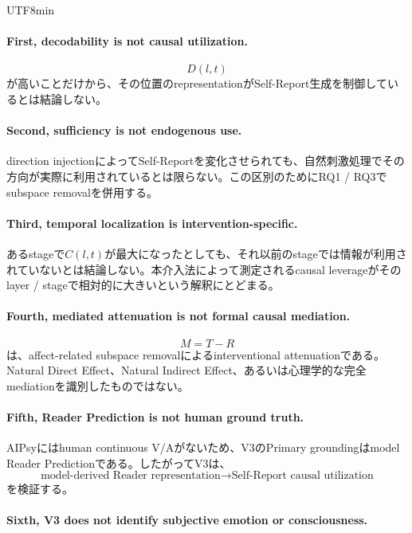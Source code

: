 \documentclass{article} %
\begin{document}
\begin{CJK*}{UTF8}{min}
\paragraph{First, decodability is not causal utilization.}
\[
D(l,t)
\]
が高いことだけから、その位置のrepresentationがSelf-Report生成を制御しているとは結論しない。


\paragraph{Second, sufficiency is not endogenous use.}

direction injectionによってSelf-Reportを変化させられても、自然刺激処理でその方向が実際に利用されているとは限らない。この区別のためにRQ1 / RQ3でsubspace removalを併用する。


\paragraph{Third, temporal localization is intervention-specific.}

あるstageで\(C(l,t)\)が最大になったとしても、それ以前のstageでは情報が利用されていないとは結論しない。本介入法によって測定されるcausal leverageがそのlayer / stageで相対的に大きいという解釈にとどまる。


\paragraph{Fourth, mediated attenuation is not formal causal mediation.}

\[
M=T-R
\]
は、affect-related subspace removalによるinterventional attenuationである。Natural Direct Effect、Natural Indirect Effect、あるいは心理学的な完全mediationを識別したものではない。


\paragraph{Fifth, Reader Prediction is not human ground truth.}

AIPsyにはhuman continuous V/Aがないため、V3のPrimary groundingはmodel Reader Predictionである。したがってV3は、
\[
\text{model-derived Reader representation}
\rightarrow
\text{Self-Report causal utilization}
\]
を検証する。


\paragraph{Sixth, V3 does not identify subjective emotion or consciousness.}


\end{CJK*}
\end{document}
